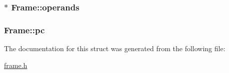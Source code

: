 \subsubsection[{\texorpdfstring{operands}{operands}}]{$\ast$ Frame\+::operands}\hypertarget{structFrame_ab311fc7762ab460f039e58b024c4d229}{}\label{structFrame_ab311fc7762ab460f039e58b024c4d229}
\subsubsection[{\texorpdfstring{pc}{pc}}]{ Frame\+::pc}\hypertarget{structFrame_ada6a6cf76d00cbadf43a86a686dd026c}{}\label{structFrame_ada6a6cf76d00cbadf43a86a686dd026c}


The documentation for this struct was generated from the following file\+:\begin{DoxyCompactItemize}
\item 
\hyperlink{frame_8h}{frame.\+h}\end{DoxyCompactItemize}
